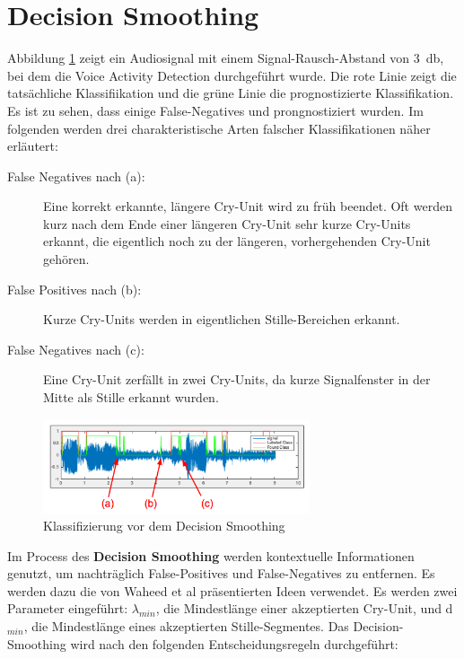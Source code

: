 \section{Decision Smoothing}
\label{sec:decision_smoothing_new}


Abbildung \ref{img:beforeSmoothing} zeigt ein Audiosignal mit einem Signal-Rausch-Abstand von \SI{3}{\decibel}, bei dem die Voice Activity Detection durchgeführt wurde. Die rote Linie zeigt die tatsächliche Klassifiikation und die grüne Linie die prognostizierte Klassifikation. Es ist zu sehen, dass einige False-Negatives und prongnostiziert wurden. Im folgenden werden drei charakteristische Arten falscher Klassifikationen näher erläutert:

\begin{description}
	\item [False Negatives nach (a): ] Eine korrekt erkannte, längere Cry-Unit wird zu früh beendet. Oft werden kurz nach dem Ende einer längeren Cry-Unit sehr kurze Cry-Units erkannt, die eigentlich noch zu der längeren, vorhergehenden Cry-Unit gehören.
	\item [False Positives nach (b): ] Kurze Cry-Units werden in eigentlichen Stille-Bereichen erkannt.
	\item [False Negatives nach (c): ] Eine Cry-Unit zerfällt in zwei Cry-Units, da kurze Signalfenster in der Mitte als Stille erkannt wurden.
\end{description}

\begin{figure}[h]
	\centering
	\includegraphics[width=0.7\textwidth]{bilder/smoothing02.png}
	\caption{Klassifizierung vor dem Decision Smoothing}
	\label{img:beforeSmoothing}
\end{figure}

Im Process des \textbf{Decision Smoothing} werden kontextuelle Informationen genutzt, um nachträglich False-Positives und False-Negatives zu entfernen. Es werden dazu die von Waheed et al \cite{vad_entropy} präsentierten Ideen verwendet. Es werden zwei Parameter eingeführt: $\lambda_{min}$, die Mindestlänge einer akzeptierten Cry-Unit, und d$_{min}$, die Mindestlänge eines akzeptierten Stille-Segmentes. Das Decision-Smoothing wird nach den folgenden Entscheidungsregeln durchgeführt:

